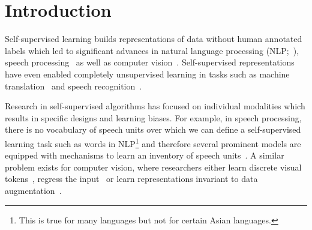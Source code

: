 \documentclass[nohyperref]{article}
\theoremstyle{plain}
\theoremstyle{definition}
\theoremstyle{remark}
\begin{document}
\begin{abstract}
While the general idea of self-supervised learning is identical across modalities, the actual algorithms and objectives differ widely because they were developed with a single modality in mind.
To get us closer to general self-supervised learning, we present \name{}, a framework that uses the same learning method for either speech, NLP or computer vision.
The core idea is to predict latent representations of the full input data based on a masked view of the input in a self-distillation setup using a standard Transformer architecture.  
Instead of predicting modality-specific targets such as words, visual tokens or units of human speech which are local in nature, \name{} predicts contextualized latent representations that contain information from the entire input.
Experiments on the major benchmarks of speech recognition, image classification, and natural language understanding demonstrate a new state of the art or competitive performance to predominant approaches.
Models and code are available at {\small\url{www.github.com/pytorch/fairseq/tree/master/examples/data2vec}}.
\end{abstract}

\section{Introduction}
\label{sec:intro}

Self-supervised learning builds representations of data without human annotated labels which led to significant advances in natural language processing (NLP;~\citealt{peters2018acl,radford2018unsup,devlin2018bert,brown2020gpt3}), speech processing~\citep{oord2018cpc,schneider2019wav2vec,baevski2020wav} as well as computer vision~\citep{chen2020simple,chen2021mocov3,caron2021dino,bao2021beit,he2021mae}.
Self-supervised representations have even enabled completely unsupervised learning in tasks such as machine translation~\citep{lample2018unsupmt} and speech recognition~\citep{baevski2021unsupervised}.

Research in self-supervised algorithms has focused on individual modalities which results in specific designs and learning biases.
For example, in speech processing, there is no vocabulary of speech units over which we can define a self-supervised learning task such as words in NLP\footnote{This is true for many languages but not for certain Asian languages.} and therefore several prominent models are equipped with mechanisms to learn an inventory of speech units~\citep{baevski2020wav,hsu2020hubert}.
A similar problem exists for computer vision, where researchers either learn discrete visual tokens~\citep{radford2021clip,bao2021beit}, regress the input~\citep{he2021mae} or learn representations invariant to data augmentation~\citep{chen2020simple,grill2020byol,caron2021dino}.
\end{document}
